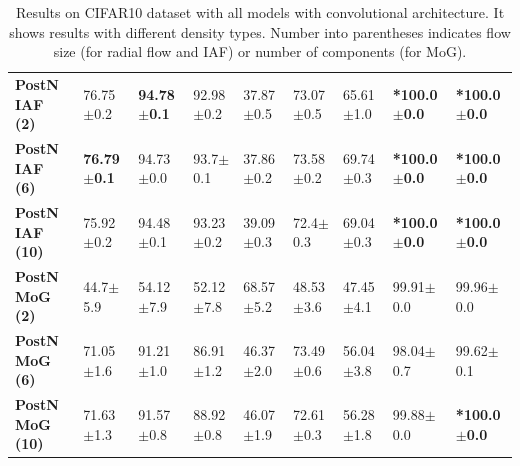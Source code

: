\begin{table}[ht]
{\begin{tabular}{lllllllll}
\textbf{PostN IAF (2)  } &  76.75$\pm$0.2 &        \textbf{94.78$\pm$0.1} &          92.98$\pm$0.2 &  37.87$\pm$0.5 &      73.07$\pm$0.5 &       65.61$\pm$1.0 &        \textbf{*100.0$\pm$0.0} &         \textbf{*100.0$\pm$0.0} \\
\textbf{PostN IAF (6)  } &  \textbf{76.79$\pm$0.1} &        94.73$\pm$0.0 &           93.7$\pm$0.1 &  37.86$\pm$0.2 &      73.58$\pm$0.2 &       69.74$\pm$0.3 &        \textbf{*100.0$\pm$0.0} &         \textbf{*100.0$\pm$0.0} \\
\textbf{PostN IAF (10) } &  75.92$\pm$0.2 &        94.48$\pm$0.1 &          93.23$\pm$0.2 &  39.09$\pm$0.3 &       72.4$\pm$0.3 &       69.04$\pm$0.3 &        \textbf{*100.0$\pm$0.0} &         \textbf{*100.0$\pm$0.0} \\
\textbf{PostN MoG (2)  } &   44.7$\pm$5.9 &        54.12$\pm$7.9 &          52.12$\pm$7.8 &  68.57$\pm$5.2 &      48.53$\pm$3.6 &       47.45$\pm$4.1 &        99.91$\pm$0.0 &         99.96$\pm$0.0 \\
\textbf{PostN MoG (6)  } &  71.05$\pm$1.6 &        91.21$\pm$1.0 &          86.91$\pm$1.2 &  46.37$\pm$2.0 &      73.49$\pm$0.6 &       56.04$\pm$3.8 &        98.04$\pm$0.7 &         99.62$\pm$0.1 \\
\textbf{PostN MoG (10) } &  71.63$\pm$1.3 &        91.57$\pm$0.8 &          88.92$\pm$0.8 &  46.07$\pm$1.9 &      72.61$\pm$0.3 &       56.28$\pm$1.8 &        99.88$\pm$0.0 &         \textbf{*100.0$\pm$0.0} \\
\bottomrule
\end{tabular}

    }
    \caption{Results on CIFAR10 dataset with all models with convolutional architecture. It shows results with different density types. Number into parentheses indicates flow size (for radial flow and IAF) or number of components (for MoG).}
    \label{fig:unc_CIFAR10_full}
\end{table}

